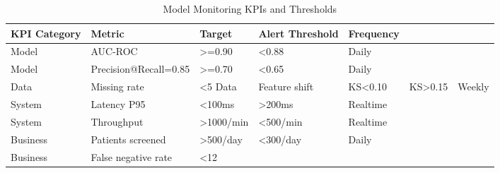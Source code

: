 \begin{table}
\caption{Model Monitoring KPIs and Thresholds}
\label{tab:kpis}
\begin{tabular}{lllll}
\toprule
KPI Category & Metric & Target & Alert Threshold & Frequency \\
\midrule
Model & AUC-ROC & >=0.90 & <0.88 & Daily \\
Model & Precision@Recall=0.85 & >=0.70 & <0.65 & Daily \\
Data & Missing rate & <5%
Data & Feature shift & KS<0.10 & KS>0.15 & Weekly \\
System & Latency P95 & <100ms & >200ms & Realtime \\
System & Throughput & >1000/min & <500/min & Realtime \\
Business & Patients screened & >500/day & <300/day & Daily \\
Business & False negative rate & <12%
\bottomrule
\end{tabular}
\end{table}
